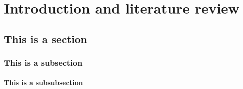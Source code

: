 \setcounter{section}{0}
\renewcommand*{\theHsection}{chX.\the\value{section}}

\chapter{Introduction and literature review}
\label{Introduction and literature review}
\lipsum

\section{This is a section}
\lipsum

\subsection{This is a subsection}
\lipsum

\subsubsection{This is a subsubsection}
\lipsum
